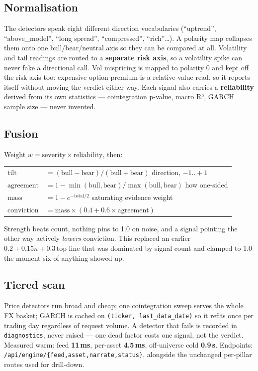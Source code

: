 \documentclass[11pt]{article}
\newcommand{\tk}[1]{\texttt{#1}}
\begin{document}
\subsection{Normalisation}
The detectors speak eight different direction vocabularies (``uptrend'',
``above\_model'', ``long spread'', ``compressed'', ``rich''\ldots). A polarity map
collapses them onto one bull/bear/neutral axis so they can be compared at all.
Volatility and tail readings are routed to a \textbf{separate risk axis}, so a
volatility spike can never fake a directional call. Vol mispricing is mapped to
polarity 0 and kept off the risk axis too: expensive option premium is a
relative-value read, so it reports itself without moving the verdict either way.
Each signal also carries a \textbf{reliability}
derived from its own statistics — cointegration p-value, macro R², GARCH sample
size — never invented.

\subsection{Fusion}
Weight \(w = \text{severity} \times \text{reliability}\), then:

\begin{keybox}
\begin{tabular}{@{}ll@{}}
\(\text{tilt}\)       & \(= (\text{bull} - \text{bear}) / (\text{bull} + \text{bear})\) \quad direction, \(-1..+1\) \\
\(\text{agreement}\)  & \(= 1 - \min(\text{bull},\text{bear})/\max(\text{bull},\text{bear})\) \quad how one-sided \\
\(\text{mass}\)       & \(= 1 - e^{-\text{total}/2}\) \quad saturating evidence weight \\
\(\text{conviction}\) & \(= \text{mass} \times (0.4 + 0.6 \times \text{agreement})\) \\
\end{tabular}
\end{keybox}

Strength beats count, nothing pins to 1.0 on noise, and a signal pointing the other
way actively \emph{lowers} conviction. This replaced an earlier
\(0.2 + 0.15n + 0.3\,\text{top}\) line that was dominated by signal count and clamped
to 1.0 the moment six of anything showed up.

\subsection{Tiered scan}
Price detectors run broad and cheap; one cointegration sweep serves the whole FX
basket; GARCH is cached on \tk{(ticker, last\_data\_date)} so it refits once per
trading day regardless of request volume. A detector that fails is recorded in
\tk{diagnostics}, never raised — one dead factor costs one signal, not the verdict.
Measured warm: feed \textbf{11\,ms}, per-asset \textbf{4.5\,ms}, off-universe cold
\textbf{0.9\,s}. Endpoints: \tk{/api/engine/\{feed,asset,narrate,status\}}, alongside
the unchanged per-pillar routes used for drill-down.
\end{document}
